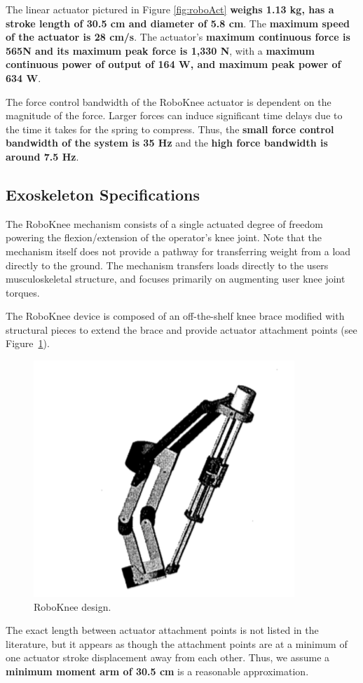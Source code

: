 \begin{refsection}
The linear actuator pictured in Figure \ref{fig:roboAct} { \bf weighs 1.13 kg, has a stroke length of 30.5 cm and diameter of 5.8 cm}.  The {\bf maximum speed of the actuator is 28 cm/s}.  The actuator's {\bf maximum continuous force is 565N and its maximum peak force is 1,330 N}, with a {\bf maximum continuous power of output of 164 W, and maximum peak power of 634 W}.   

The force control bandwidth of the RoboKnee actuator is dependent on the magnitude of the force.  Larger forces can induce significant time delays due to the time it takes for the spring to compress.  Thus, the {\bf small force control bandwidth of the system is 35 Hz} and the {\bf high force bandwidth is around 7.5 Hz}. 
 
 \subsection{Exoskeleton Specifications}
 
 The RoboKnee mechanism consists of a single actuated degree of freedom powering the flexion/extension of the operator's knee joint.  Note that the mechanism itself does not provide a pathway for transferring weight from a load directly to the ground.  The mechanism transfers loads directly to the users musculoskeletal structure, and focuses primarily on augmenting user knee joint torques.
 
 The RoboKnee device is composed of an off-the-shelf knee brace modified with structural pieces to extend the brace and provide actuator attachment points (see Figure~\ref{fig:roboKnee}).
 \begin{figure}[thpb]
\centering
\includegraphics[width=3.in]{exos/figs/roboKnee/roboBrace}
  \caption{RoboKnee design.}
 \label{fig:roboKnee}   
 \end{figure}
 The exact length between actuator attachment points is not listed in the literature, but it appears as though the attachment points are at a minimum of one actuator stroke displacement away from each other. Thus, we assume a {\bf minimum moment arm of 30.5 cm} is a reasonable approximation.
 

\end{refsection}
